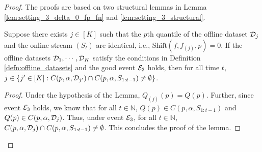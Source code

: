 \begin{proof} 



{\color{black}

The proofs  are based on two structural lemmas in Lemma \ref{lem:setting_3_delta_0_fp_fn} and \ref{lem:setting_3_structural}. 

\begin{lemma}
    Suppose there exists $j \in [K]$ such that the $p$th quantile of the offline dataset ${\mathcal{D}}_j$ and the online stream $(S_t)$ are identical, i.e., $\text{Shift}(f, f_{(j)},p)=0$. If the offline datasets ${\mathcal{D}}_1, \cdots, {\mathcal{D}}_K$ satisfy the conditions in Definition \ref{defn:offline_datasets} and the good event ${\mathcal{E}}_3$ holds, then for all time $t$, $j \in \{j' \in [K]: C(p,\alpha, {\mathcal{D}}_{j'}) \cap C(p, \alpha, S_{1:t-1}) \neq \emptyset \}$.
\label{lem:setting_3_delta_0_fp_fn}
\end{lemma}\begin{proof}
   Under the hypothesis of the Lemma,  $Q_{(j)}(p) = Q(p) $.  Further, since event ${\mathcal{E}}_3$ holds, we know that for all $t \in \mathbb{N}$, $Q(p) \in C(p,\alpha,S_{1:t-1})$ and $Q(p) \in C(p,\alpha, {\mathcal{D}}_j)$. Thus, under event ${\mathcal{E}}_3$, for all $t \in \mathbb{N}$, $C(p,\alpha, {\mathcal{D}}_j) \cap C(p,\alpha,S_{1:t-1}) \neq \emptyset$. This concludes the proof of the lemma. 
\end{proof}


    
}
\end{proof}
